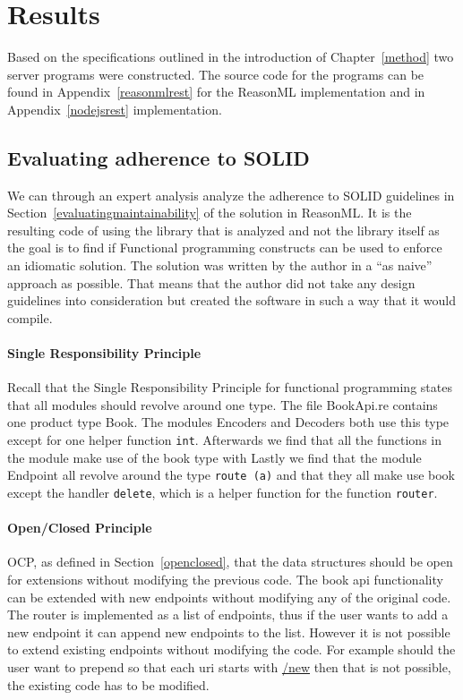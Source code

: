 \chapter{Results}\label{results}


Based on the specifications outlined in the introduction of Chapter~\ref{method}
two server programs were constructed.  The source code for the programs can be
found in Appendix~\ref{reasonmlrest} for the ReasonML implementation and in
Appendix~\ref{nodejsrest} implementation.

\section{Evaluating adherence to SOLID}

We can through an expert analysis analyze the adherence to SOLID guidelines in
Section~\ref{evaluatingmaintainability} of the solution in ReasonML. It is the
resulting code of using the library that is analyzed and not the library itself
as the goal is to find if Functional programming constructs can be used to
enforce an idiomatic solution.  The solution was written by the author in a
``as naive'' approach as possible.  That means that the author did not take any
design guidelines into consideration but created the software in such a way
that it would compile.

\subsubsection{Single Responsibility Principle}

Recall that the Single Responsibility Principle for functional programming
states that all modules should revolve around one type.  The file BookApi.re
contains one product type Book. The modules Encoders and Decoders both use this
type except for one helper function \texttt{int}.  Afterwards we find that all
the functions in the module make use of the book type with Lastly we find that
the module Endpoint all revolve around the type \texttt{route (a)} and that they
all make use book except the handler \texttt{delete}, which is a helper
function for the function \texttt{router}.

\subsubsection{Open/Closed Principle}

OCP, as defined in Section~\ref{openclosed}, that the data structures should be
open for extensions without modifying the previous code.  The book api
functionality can be extended with new endpoints without modifying any of the
original code. The router is implemented as a list of endpoints, thus if the
user wants to add a new endpoint it can append new endpoints to the list.
However it is not possible to extend existing endpoints without modifying the
code.  For example should the user want to prepend so that each uri starts with
\url{/new} then that is not possible, the existing code has to be modified.

